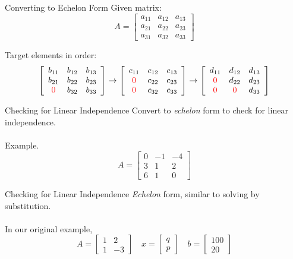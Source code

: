 \documentclass{./../../Latex/teaching_slides}
\begin{document}
\begin{frame}{Converting to Echelon Form}
Given matrix:
$$ A= \left[\begin{array}{ccc}
a_{11} & a_{12} & a_{13} \\
a_{21} & a_{22} & a_{23}  \\
a_{31} & a_{32} & a_{33}
\end{array}\right] $$
\vspace{1em}

Target elements in order:
$$
\left[\begin{array}{ccc}
b_{11} & b_{12} & b_{13} \\
b_{21} & b_{22} & b_{23}  \\
\textcolor{red}{0} & b_{32} & b_{33}
\end{array}\right] \rightarrow
\left[\begin{array}{ccc}
c_{11} & c_{12} & c_{13} \\
\textcolor{red}{0} & c_{22} & c_{23}  \\
\textcolor{red}{0} & c_{32} & c_{33}
\end{array}\right] \rightarrow
\left[\begin{array}{ccc}
d_{11} & d_{12} & d_{13} \\
\textcolor{red}{0} & d_{22} & d_{23}  \\
\textcolor{red}{0} & \textcolor{red}{0} & d_{33}
\end{array}\right]
$$
\end{frame}


\begin{frame}{Checking for Linear Independence}
Convert to \textit{echelon} form to check for linear independence. \\~\\
Example. $$
A=\left[\begin{array}{ccc}
0 & -1 & -4 \\
3 & 1 & 2 \\
6 & 1 & 0
\end{array}\right]
$$
\end{frame}

\begin{frame}{Checking for Linear Independence}
\textit{Echelon} form, similar to solving by substitution. \\~\\
In our original example, 
$$A = \begin{bmatrix}
1 & 2 \\
1 & -3 
\end{bmatrix} \quad 
x = \begin{bmatrix}
q \\
p 
\end{bmatrix} \quad 
b = \begin{bmatrix}
100 \\
20 
\end{bmatrix}$$
\end{frame}
\end{document}
